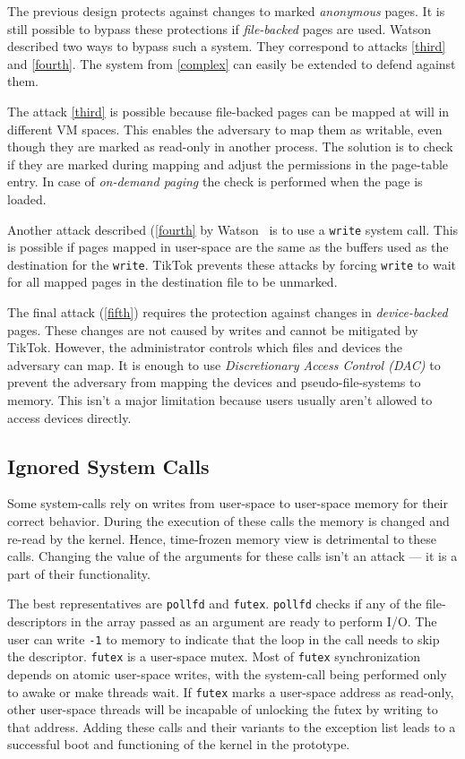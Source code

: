 \documentclass[conference]{IEEEtran}
\newcommand{\sysname}{TikTok}
\begin{document}
The previous design protects against changes to marked \emph{anonymous} pages. It is
still possible to bypass these protections if \emph{file-backed} pages are used.
Watson~\cite{watson2007exploiting} described two ways to bypass such a system.
They correspond to attacks \autoref{third} and \autoref{fourth}. The system from
\autoref{complex} can easily be extended to defend against them.

The attack \autoref{third} is possible because file-backed pages can be mapped
at will in different VM spaces. This enables the adversary to map them as
writable, even though they are marked as read-only in another process. The 
solution is to check if they are marked during mapping and adjust the permissions
in the page-table entry. In case of \emph{on-demand paging} the check is performed
when the page is loaded.

Another attack described (\autoref{fourth} by Watson~\cite{watson2007exploiting}
is to use a \texttt{write} system call. This is possible if pages mapped in
user-space are the same as the buffers used as the destination for the
\texttt{write}. \sysname{} prevents these attacks by forcing \texttt{write} to
wait for all mapped pages in the destination file to be unmarked.

The final attack (\autoref{fifth}) requires the protection against changes in
\emph{device-backed} pages. These changes are not caused by writes and cannot be
mitigated by \sysname{}. However, the administrator controls which files and
devices the adversary can map. It is enough to use \emph{Discretionary Access
Control (DAC)} to prevent the adversary from mapping the devices and
pseudo-file-systems to memory. This isn't a major limitation because users
usually aren't allowed to access devices directly.

\subsection{Ignored System Calls}
\label{subsec:ignoredcalls}

Some system-calls rely on writes from user-space to user-space memory for their
correct behavior. During the execution of these calls the memory is changed and
re-read by the kernel. Hence, time-frozen memory view is detrimental to these calls.
Changing the value of the arguments for these calls isn't an attack --- it is a
part of their functionality.

The best representatives are \texttt{pollfd} and \texttt{futex}. \texttt{pollfd}
checks if any of the file-descriptors in the array passed as an argument are
ready to perform I/O. The user can write \texttt{-1} to memory to indicate that
the loop in the call needs to skip the descriptor. \texttt{futex} is a
user-space mutex. Most of \texttt{futex} synchronization depends on atomic
user-space writes, with the system-call being performed only to awake or make
threads wait. If \texttt{futex} marks a user-space address as read-only, other
user-space threads will be incapable of unlocking the futex by writing to that
address. Adding these calls and their variants to the exception list leads to a
successful boot and functioning of the kernel in the prototype.
\end{document}

